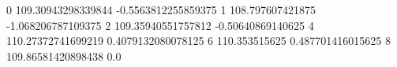 0 109.30943298339844 -0.5563812255859375
1 108.797607421875 -1.068206787109375
2 109.35940551757812 -0.50640869140625
4 110.27372741699219 0.4079132080078125
6 110.353515625 0.487701416015625
8 109.86581420898438 0.0
